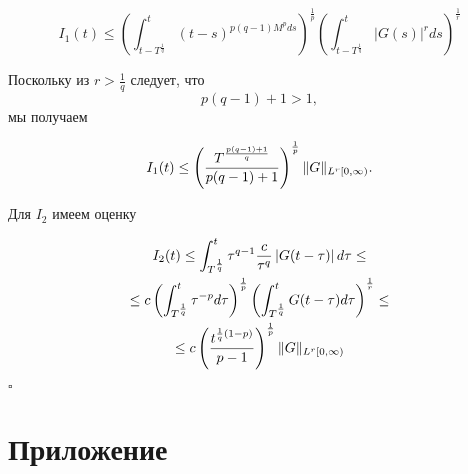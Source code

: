 \begin{equation*}
    I_1(t) \leq \left( \int_{t-T^{\frac{1}{q}}}^t (t-s)^{p(q-1)M^p ds} \right)^{\frac{1}{p}}
    \left( \int_{t-T^{\frac{1}{q}}}^t \left|G(s)\right|^r ds \right)^{\frac{1}{r}}
\end{equation*}

\noindent Поскольку из $r > \frac{1}{q}$ следует, что
$$p(q-1) + 1 > 1,$$
мы получаем

\begin{equation*}
    I_1(t) \leq \left( \frac{T^{\frac{p(q-1)+1}{q}}}{p(q-1)+1} \right)^{\frac{1}{p}} \lVert G\rVert_{L^r [0, \infty)}.
\end{equation*}

\noindent Для $I_2$ имеем оценку

\begin{equation*}
    \begin{gathered}
        I_2(t) \leq \int_{T^{\frac{1}{q}}}^t \tau^{q-1} \frac{c}{\tau^q} \left| G(t- \tau) \right| d\tau \leq \\
        \leq c \left( \int_{T^{\frac{1}{q}}}^t \tau^{-p} d\tau \right)^{\frac{1}{p}}
        \left( \int_{T^{\frac{1}{q}}}^{t} G(t - \tau) d\tau \right)^{\frac{1}{r}} \leq \\
        \leq c \left( \frac{t^{\frac{1}{q}(1-p)}}{p-1} \right)^{\frac{1}{p}} \lVert G\rVert_{L^r[0, \infty)}
    \end{gathered}
\end{equation*}

\begin{flushright}
$\square$
\end{flushright}

\clearpage


\nocite{*}

\printbibliography{}

\clearpage

\section*{Приложение}

\inputminted[fontfamily=courier, mathescape]{python}{app/main.py}

